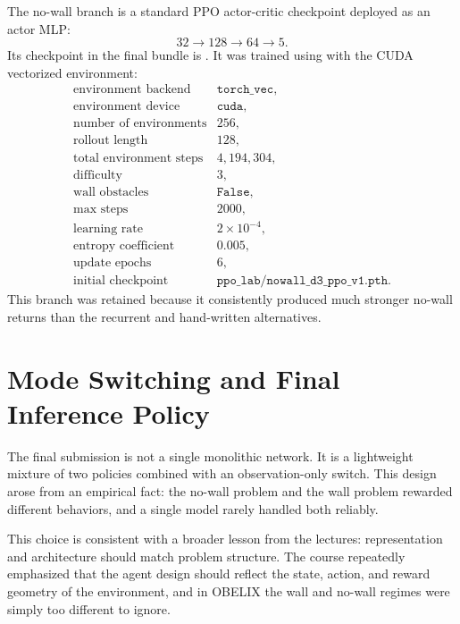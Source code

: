 \documentclass[11pt]{article}
\begin{document}
The no-wall branch is a standard PPO actor-critic checkpoint deployed as an actor MLP:
\[
  32 \rightarrow 128 \rightarrow 64 \rightarrow 5.
\]
Its checkpoint in the final bundle is . It was
trained using  with the CUDA vectorized environment:
\[
\begin{array}{ll}
\text{environment backend} & \texttt{torch\_vec},\\
\text{environment device} & \texttt{cuda},\\
\text{number of environments} & 256,\\
\text{rollout length} & 128,\\
\text{total environment steps} & 4{,}194{,}304,\\
\text{difficulty} & 3,\\
\text{wall obstacles} & \texttt{False},\\
\text{max steps} & 2000,\\
\text{learning rate} & 2\times10^{-4},\\
\text{entropy coefficient} & 0.005,\\
\text{update epochs} & 6,\\
\text{initial checkpoint} & \texttt{ppo\_lab/nowall\_d3\_ppo\_v1.pth}.
\end{array}
\]
This branch was retained because it consistently produced much stronger no-wall returns
than the recurrent and hand-written alternatives.

\section{Mode Switching and Final Inference Policy}

The final submission is not a single monolithic network. It is a lightweight mixture of
two policies combined with an observation-only switch. This design arose from an
empirical fact: the no-wall problem and the wall problem rewarded different behaviors,
and a single model rarely handled both reliably.

This choice is consistent with a broader lesson from the lectures: representation and
architecture should match problem structure. The course repeatedly emphasized that the
agent design should reflect the state, action, and reward geometry of the environment,
and in OBELIX the wall and no-wall regimes were simply too different to ignore.
\end{document}
